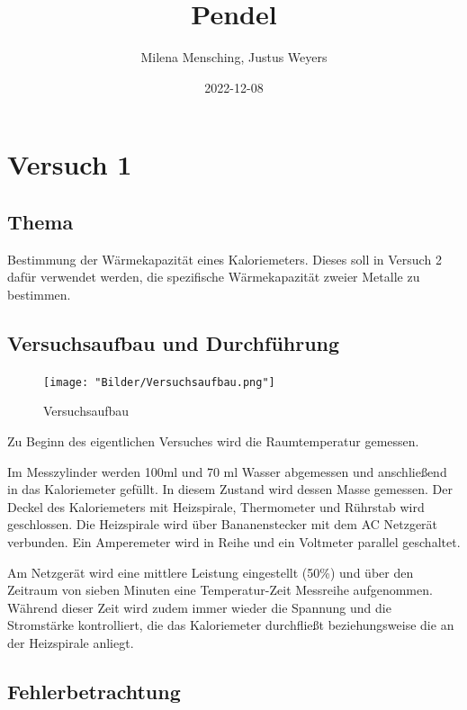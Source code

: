 \documentclass[
  9pt,
]{article}
\title{Pendel}
\author{Milena Mensching, Justus Weyers}
\date{2022-12-08}
\begin{document}
\maketitle

\hypertarget{versuch-1}{%
\section{Versuch 1}\label{versuch-1}}

\hypertarget{thema}{%
\subsection{Thema}\label{thema}}

Bestimmung der Wärmekapazität eines Kaloriemeters. Dieses soll in
Versuch 2 dafür verwendet werden, die spezifische Wärmekapazität zweier
Metalle zu bestimmen.

\hypertarget{versuchsaufbau-und-durchfuxfchrung}{%
\subsection{Versuchsaufbau und
Durchführung}\label{versuchsaufbau-und-durchfuxfchrung}}

\begin{figure}
\centering
\texttt{[image: "Bilder/Versuchsaufbau.png"]}
\caption{Versuchsaufbau}
\end{figure}

Zu Beginn des eigentlichen Versuches wird die Raumtemperatur gemessen.

Im Messzylinder werden 100ml und 70 ml Wasser abgemessen und
anschließend in das Kaloriemeter gefüllt. In diesem Zustand wird dessen
Masse gemessen. Der Deckel des Kaloriemeters mit Heizspirale,
Thermometer und Rührstab wird geschlossen. Die Heizspirale wird über
Bananenstecker mit dem AC Netzgerät verbunden. Ein Amperemeter wird in
Reihe und ein Voltmeter parallel geschaltet.

Am Netzgerät wird eine mittlere Leistung eingestellt (50\%) und über den
Zeitraum von sieben Minuten eine Temperatur-Zeit Messreihe aufgenommen.
Während dieser Zeit wird zudem immer wieder die Spannung und die
Stromstärke kontrolliert, die das Kaloriemeter durchfließt
beziehungsweise die an der Heizspirale anliegt.

\hypertarget{fehlerbetrachtung}{%
\subsection{Fehlerbetrachtung}\label{fehlerbetrachtung}}
\end{document}
